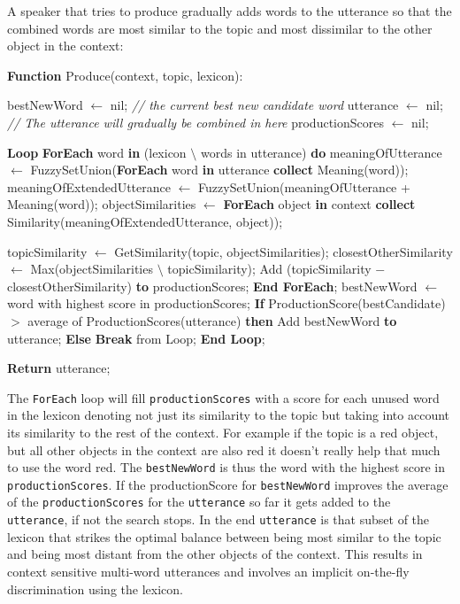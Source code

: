  A speaker that tries to produce gradually
adds words to the utterance so that the combined words are most
similar to the topic and most dissimilar to the other object in the
context:

\begin{verbatim+}
\textbf{Function} Produce(context, topic, lexicon):

bestNewWord $\leftarrow$ nil; \textit{// the current best new candidate word} 
utterance $\leftarrow$ nil; \textit{// The utterance will gradually be combined in here} 
productionScores $\leftarrow$ nil;

\textbf{Loop}
    \textbf{ForEach} word \textbf{in} (lexicon $\setminus$ words in utterance) \textbf{do}
        meaningOfUtterance $\leftarrow$ FuzzySetUnion(\textbf{ForEach} word \textbf{in} utterance
                                            \textbf{collect} Meaning(word));
        meaningOfExtendedUtterance $\leftarrow$ FuzzySetUnion(meaningOfUtterance 
                                                    + Meaning(word));
        objectSimilarities $\leftarrow$ \textbf{ForEach} object \textbf{in} context 
                              \textbf{collect} Similarity(meaningOfExtendedUtterance, 
                                                 object));

        topicSimilarity $\leftarrow$ GetSimilarity(topic, objectSimilarities);
        closestOtherSimilarity $\leftarrow$ Max(objectSimilarities $\setminus$ topicSimilarity);
        Add (topicSimilarity $-$ closestOtherSimilarity) \textbf{to} productionScores;
    \textbf{End ForEach};
    bestNewWord $\leftarrow$ word with highest score in productionScores;
    \textbf{If} ProductionScore(bestCandidate) $>$ average of ProductionScores(utterance)
        \textbf{then} Add bestNewWord \textbf{to} utterance;
        \textbf{Else} \textbf{Break} from Loop;
\textbf{End Loop};

\textbf{Return} utterance;
\end{verbatim+}

\noindent The \texttt{ForEach} loop will fill
\texttt{productionScores} with a score for each unused word in the
lexicon denoting not just its similarity to the topic but taking into
account its similarity to the rest of the context. For example if the
topic is a red object, but all other objects in the context are also
red it doesn't really help that much to use the word red. The
\texttt{bestNewWord} is thus the word with the highest score in
\texttt{productionScores}. If the productionScore for
\texttt{bestNewWord} improves the average of the
\texttt{productionScores} for the \verb+utterance+ so far it gets
added to the \texttt{utterance}, if not the search stops. In the end
\texttt{utterance} is that subset of the lexicon that strikes the
optimal balance between being most similar to the topic and being most
distant from the other objects of the context. This results in context
sensitive multi-word utterances and involves an implicit on-the-fly
discrimination using the lexicon.


